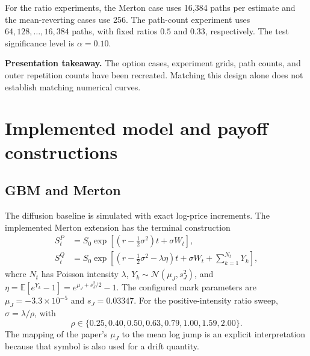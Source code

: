 \documentclass[11pt,a4paper]{article}
\newcommand{\E}{\mathbb{E}}
\begin{document}
For the ratio experiments, the Merton case uses 16,384 paths per estimate
and the mean-reverting cases use 256. The path-count experiment uses
$64,128,\ldots,16{,}384$ paths, with fixed ratios $0.5$ and $0.33$,
respectively. The test significance level is $\alpha=0.10$.

\textbf{Presentation takeaway.} The option cases, experiment grids, path
counts, and outer repetition counts have been recreated. Matching this
design alone does not establish matching numerical curves.

\newpage
\section{Implemented model and payoff constructions}
\subsection{GBM and Merton}
The diffusion baseline is simulated with exact log-price increments.
The implemented Merton extension has the terminal construction
\begin{align}
S_t^{P}&=S_0\exp\!\left[(r-\tfrac12\sigma^2)t+\sigma W_t\right],\\
S_t^{Q}&=S_0\exp\!\left[(r-\tfrac12\sigma^2-\lambda\eta)t
                  +\sigma W_t+\sum_{k=1}^{N_t}Y_k\right],
\end{align}
where $N_t$ has Poisson intensity $\lambda$,
$Y_k\sim\mathcal N(\mu_J,s_J^2)$, and
$\eta=\E[e^{Y_k}-1]=e^{\mu_J+s_J^2/2}-1$.
The configured mark parameters are $\mu_J=-3.3\times10^{-5}$ and
$s_J=0.03347$. For the positive-intensity ratio sweep,
$\sigma=\lambda/\rho$, with
\[
\rho\in\{0.25,0.40,0.50,0.63,0.79,1.00,1.59,2.00\}.
\]
The mapping of the paper's $\mu_J$ to the mean log jump is an explicit
interpretation because that symbol is also used for a drift quantity.
\end{document}

